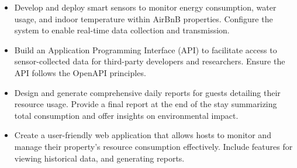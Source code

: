 \begin{itemize}
    \item Develop and deploy smart sensors to monitor energy consumption, water usage, and indoor temperature within 
    AirBnB properties. Configure the system to enable real-time data collection and transmission.
    \item Build an Application Programming Interface (API) to facilitate access to sensor-collected data for 
    third-party developers and researchers. Ensure the API follows the OpenAPI principles.
    \item Design and generate comprehensive daily reports for guests detailing their resource usage. Provide a final 
    report at the end of the stay summarizing total consumption and offer insights on environmental impact.
    \item Create a user-friendly web application that allows hosts to monitor and manage their property's resource 
    consumption effectively. Include features for viewing historical data, and generating reports.
\end{itemize}